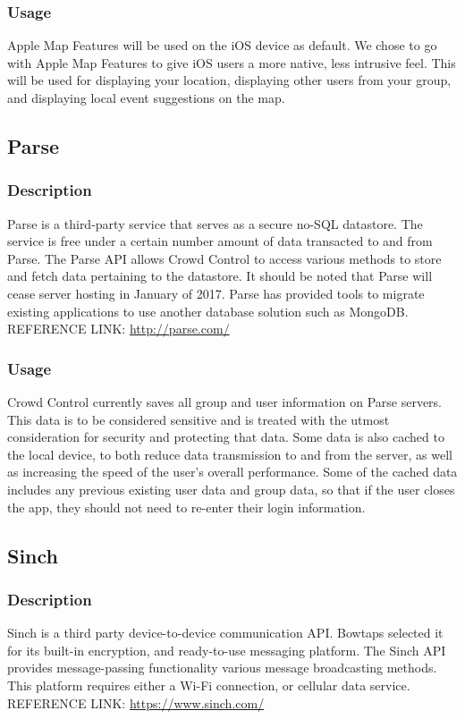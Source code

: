 	\subsubsection{Usage}
	Apple Map Features will be used on the iOS device as default. We chose to go with Apple Map Features to give iOS users a more native, less intrusive feel. This will be used for displaying your location, displaying other users from your group, and displaying local event suggestions on the map.

\subsection{Parse}
	\subsubsection{Description}
	Parse is a third-party service that serves as a secure no-SQL datastore. The service is free under a certain number amount of data transacted to and from Parse. The Parse API allows Crowd Control to access various methods to store and fetch data pertaining to the datastore. It should be noted that Parse will cease server hosting in January of 2017. Parse has provided tools to migrate existing applications to use another database solution such as MongoDB.
\newline
REFERENCE LINK: \url{http://parse.com/}
	\subsubsection{Usage}
	Crowd Control currently saves all group and user information on Parse servers. This data is to be considered sensitive and is treated with the utmost consideration for security and protecting that data. Some data is also cached to the local device, to both reduce data transmission to and from the server, as well as increasing the speed of the user's overall performance. Some of the cached data includes any previous existing user data and group data, so that if the user closes the app, they should not need to re-enter their login information. 
	
\subsection{Sinch}
	\subsubsection{Description}
	Sinch is a third party device-to-device communication API. Bowtaps selected it for its built-in encryption, and ready-to-use messaging platform. The Sinch API provides message-passing functionality various message broadcasting methods. This platform requires either a Wi-Fi connection, or cellular data service. 
\newline
REFERENCE LINK: \url{https://www.sinch.com/}
	
